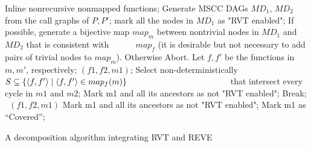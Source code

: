 \noindent
\begin{algorithm}
\begin{minipage}{\linewidth}
\begin{algorithmic}[1]
\State \label{step:inline} Inline nonrecursive nonmapped functions;
\State \label{step:generate} Generate MSCC DAGs $MD_1$, $MD_2$ from the call graphs of $P, P′$; 
\State \label{step:markEnabled} mark all the nodes in $MD_1$ as "RVT enabled";
\State If possible, generate a bijective map $map_m$ between nontrivial nodes in $MD_1$ and $MD_2$ that is consistent with \mbox{~~~~~} $map_f$ (it is desirable but not necessary to add pairs of trivial nodes to $map_m$). Otherwise Abort. 
 \label{step:whileOneSide}
 \label{step:findMapping}
    \label{step:m1}
     \State Let $f,f'$ be the functions in $m,m'$, respectively;
      \label{step:Check}
      $(f1, f2, m1)$; \label{step:markTrivial}
    \EndIf
   \Else
    \label{step:select} 
    \State Select non-deterministically $S \subseteq \{\langle f,f'\rangle\mid \langle f,f'\rangle\in map_f(m)\}$ \newline \mbox{~~~~~~~~~~~~~~~~~~~~~~~} that intersect every cycle in $m1$ and $m2$;
      \label{step:forall}
         \label{step:abort}
         \State Mark m1 and all its ancestors as not "RVT enabled"; \label{step:doom}
        \State Break;
        \EndIf
      \EndFor
       \label{step:markNonTrivial}
      \ {$(f1, f2, m1)$}
      \EndFor
      \EndIf
      \EndIf
      \Else
      \State Mark m1 and all its ancestors as not "RVT enabled";
      \EndIf
   \EndIf
   \State Mark m1 as “Covered”;
\EndWhile
\EndFunction
\end{algorithmic}
\end{minipage}
\caption{A decomposition algorithm integrating RVT and REVE}
\label{alg:Prove}
\end{algorithm}
